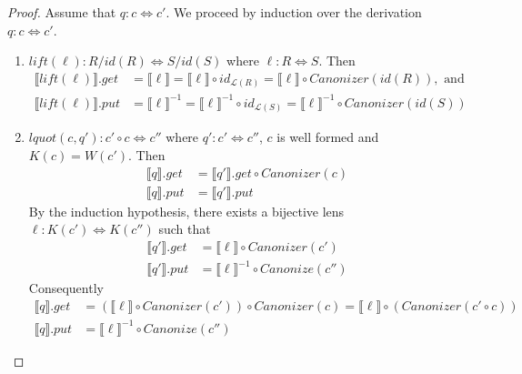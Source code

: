 \documentclass{svproc}
\newcommand{\canonizer}{\ensuremath{\mathit{Canonizer}}}
\begin{document}
\begin{proof}
Assume that $q : c \Leftrightarrow c'$. We proceed by induction over the
derivation $q : c \Leftrightarrow c'$.
\begin{enumerate}
  \item
  $\mathit{lift}(\ell): R/\mathit{id}(R) \Leftrightarrow S/\mathit{id}(S)$ where
  $\ell :
  R \Leftrightarrow S$. Then
  \begin{align*}
  \llbracket \mathit{lift}(\ell) \rrbracket.get &=  \llbracket \ell \rrbracket
  = \llbracket \ell \rrbracket \circ id_{\mathcal{L}(R)} =
  \llbracket \ell \rrbracket \circ \canonizer(\mathit{id}(R)), \text{ and }\\
  \llbracket \mathit{lift}(\ell) \rrbracket.put &= \llbracket \ell
  \rrbracket^{-1} = \llbracket \ell \rrbracket^{-1} \circ id_{\mathcal{L}(S)} =
  \llbracket \ell \rrbracket^{-1} \circ \canonizer(id(S))
  \end{align*}
  \item
  $\mathit{lquot}(c, q'): c' \circ c \Leftrightarrow c''$ where $q' : c' 
  \Leftrightarrow c''$, $c$ is well formed and $K(c) = W(c')$. Then
\begin{align*}
  \llbracket q \rrbracket.get  &= \llbracket q'
  \rrbracket.get \circ \canonizer(c)\\
  \llbracket q \rrbracket.put &= \llbracket q' \rrbracket.put
  \end{align*}
  By the induction hypothesis, there exists a bijective lens $\ell :
  K(c') \Leftrightarrow K(c'')$ such that 
  \begin{align*}
\llbracket q' \rrbracket.get &= \llbracket \ell \rrbracket \circ \canonizer(c')\\
\llbracket q' \rrbracket.put &= \llbracket \ell \rrbracket^{-1} \circ
Canonize(c'')
\end{align*}
Consequently
\begin{align*}
  \llbracket q \rrbracket.get  &= (\llbracket \ell \rrbracket \circ
  \canonizer(c')) \circ \canonizer(c) = \llbracket \ell \rrbracket \circ
  (\canonizer(c' \circ c))\\
  \llbracket q \rrbracket.put &= \llbracket \ell \rrbracket^{-1} \circ
  Canonize(c'')
  \end{align*}


\end{enumerate}
\end{proof}
\end{document}
